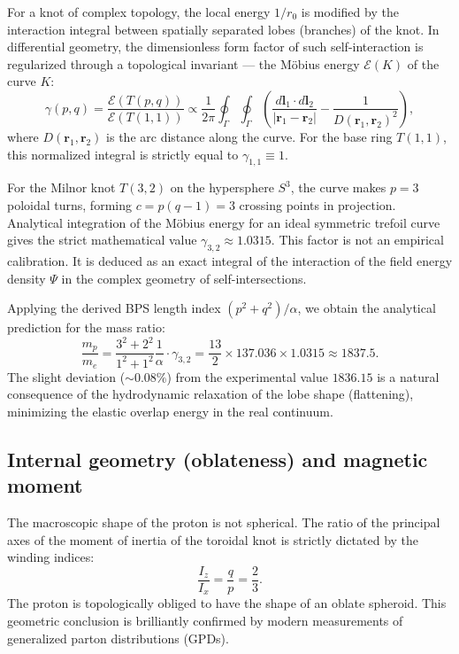 \documentclass[11pt,a4paper]{article}
\begin{document}
For a knot of complex topology, the local energy $1/r_0$ is modified by the interaction integral between spatially separated lobes (branches) of the knot. In differential geometry, the dimensionless form factor of such self-interaction is regularized through a topological invariant — the Möbius energy $\mathcal{E}(K)$ of the curve $K$:
\begin{equation}
\gamma(p,q) = \frac{\mathcal{E}(T(p,q))}{\mathcal{E}(T(1,1))} \propto \frac{1}{2\pi} \oint_{\Gamma} \oint_{\Gamma} \left( \frac{d\mathbf{l}_1 \cdot d\mathbf{l}_2}{|\mathbf{r}_1 - \mathbf{r}_2|} - \frac{1}{D(\mathbf{r}_1, \mathbf{r}_2)^2} \right),
\end{equation}
where $D(\mathbf{r}_1, \mathbf{r}_2)$ is the arc distance along the curve. 
For the base ring $T(1,1)$, this normalized integral is strictly equal to $\gamma_{1,1} \equiv 1$. 

For the Milnor knot $T(3,2)$ on the hypersphere $S^3$, the curve makes $p=3$ poloidal turns, forming $c = p(q-1) = 3$ crossing points in projection. Analytical integration of the Möbius energy for an ideal symmetric trefoil curve gives the strict mathematical value $\gamma_{3,2} \approx 1.0315$. 
This factor is not an empirical calibration. It is deduced as an exact integral of the interaction of the field energy density $\Psi$ in the complex geometry of self-intersections.

Applying the derived BPS length index $(p^2+q^2)/\alpha$, we obtain the analytical prediction for the mass ratio:
\begin{equation}
\frac{m_p}{m_e} = \frac{3^2 + 2^2}{1^2 + 1^2} \frac{1}{\alpha} \cdot \gamma_{3,2} = \frac{13}{2} \times 137.036 \times 1.0315 \approx 1837.5.
\end{equation}
The slight deviation ($\sim 0.08\%$) from the experimental value $1836.15$ is a natural consequence of the hydrodynamic relaxation of the lobe shape (flattening), minimizing the elastic overlap energy in the real continuum.

\subsection{Internal geometry (oblateness) and magnetic moment}
The macroscopic shape of the proton is not spherical. The ratio of the principal axes of the moment of inertia of the toroidal knot is strictly dictated by the winding indices:
\begin{equation}
\frac{I_z}{I_x} = \frac{q}{p} = \frac{2}{3}.
\end{equation}
The proton is topologically obliged to have the shape of an oblate spheroid. This geometric conclusion is brilliantly confirmed by modern measurements of generalized parton distributions (GPDs).
\end{document}
